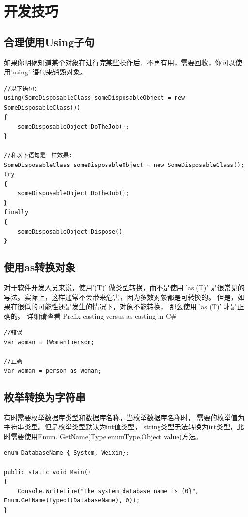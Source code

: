 \documentclass{book}
\begin{document}
\section{开发技巧}



\subsection{合理使用Using子句}

如果你明确知道某个对象在进行完某些操作后，不再有用，需要回收，你可以使用'using' 语句来销毁对象。

\begin{lstlisting}[language={[Sharp]C}]
//以下语句:
using(SomeDisposableClass someDisposableObject = new SomeDisposableClass())
{
	someDisposableObject.DoTheJob();
}

//和以下语句是一样效果:
SomeDisposableClass someDisposableObject = new SomeDisposableClass();
try
{
	someDisposableObject.DoTheJob();
}
finally
{
	someDisposableObject.Dispose();
}
\end{lstlisting}

\subsection{使用as转换对象}

对于软件开发人员来说，使用'(T)' 做类型转换，而不是使用 'as (T)' 是很常见的写法。实际上，这样通常不会带来危害，因为多数对象都是可转换的。
但是，如果在很低的可能性还是发生的情况下，对象不能转换，
那么使用 'as (T)' 才是正确的。 
详细请查看 Prefix-casting versus as-casting in C\# 
\begin{lstlisting}	
//错误
var woman = (Woman)person;
	
//正确
var woman = person as Woman;
\end{lstlisting}

\subsection{枚举转换为字符串}

有时需要枚举数据库类型和数据库名称，当枚举数据库名称时，
需要的枚举值为字符串类型。但是枚举类型默认为int值类型，
string类型无法转换为int类型，此时需要使用Enum.
GetName(Type enumType,Object value)方法。

\begin{lstlisting}[language={[Sharp]C}]
enum DatabaseName { System, Weixin};    

public static void Main() 
{        
    Console.WriteLine("The system database name is {0}", Enum.GetName(typeof(DatabaseName), 0));
}	
\end{lstlisting}	
\end{document}
